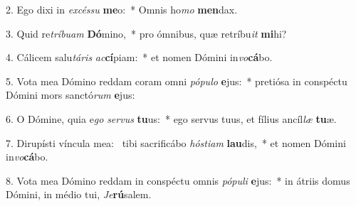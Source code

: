 2. Ego dixi in \textit{ex}\textit{cés}\textit{su} \textbf{me}o:~*  Omnis ho\textit{mo} \textbf{men}dax.\

3. Quid re\textit{trí}\textit{bu}\textit{am} \textbf{Dó}mino,~*  pro ómnibus, quæ retríbu\textit{it} \textbf{mi}hi?\

4. Cálicem salu\textit{tá}\textit{ris} \textit{ac}\textbf{cí}piam:~*  et nomen Dómini in\textit{vo}\textbf{cá}bo.\

5. Vota mea Dómino reddam coram omni \textit{pó}\textit{pu}\textit{lo} \textbf{e}jus:~*  pretiósa in conspéctu Dómini mors sanctó\textit{rum} \textbf{e}jus:\

6. O Dómine, quia e\textit{go} \textit{ser}\textit{vus} \textbf{tu}us:~*  ego servus tuus, et fílius ancíl\textit{læ} \textbf{tu}æ.\

7. Dirupísti víncula mea: \dag\  tibi sacrificábo \textit{hós}\textit{ti}\textit{am} \textbf{lau}dis,~*  et nomen Dómini in\textit{vo}\textbf{cá}bo.\

8. Vota mea Dómino reddam in conspéctu omnis \textit{pó}\textit{pu}\textit{li} \textbf{e}jus:~*  in átriis domus Dómini, in médio tui, \textit{Je}\textbf{rú}salem.\

